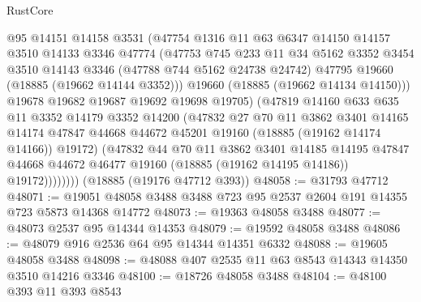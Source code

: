 \begin{lexlean}{RustCore}
\begin{coremodule}
                  @95
                  @14151
                  @14158
                  @3531
                  (@47754
                    @1316
                    @11
                    @63
                    @6347
                    @14150
                    @14157
                    @3510
                    @14133
                    @3346
                    @47774
                    (@47753
                      @745
                      @233
                      @11
                      @34
                      @5162
                      @3352
                      @3454
                      @3510
                      @14143
                      @3346
                      (@47788 @744 @5162 @24738 @24742)
                      @47795
                      @19660
                      (@18885 (@19662 @14144 @3352)))
                    @19660
                    (@18885 (@19662 @14134 @14150)))
                  @19678
                  @19682
                  @19687
                  @19692
                  @19698
                  @19705)
                (@47819
                  @14160
                  @633
                  @635
                  @11
                  @3352
                  @14179
                  @3352
                  @14200
                  (@47832
                    @27
                    @70
                    @11
                    @3862
                    @3401
                    @14165
                    @14174
                    @47847
                    @44668
                    @44672
                    @45201
                    @19160
                    (@18885 (@19162 @14174 @14166))
                    @19172)
                  (@47832
                    @44
                    @70
                    @11
                    @3862
                    @3401
                    @14185
                    @14195
                    @47847
                    @44668
                    @44672
                    @46477
                    @19160
                    (@18885 (@19162 @14195 @14186))
                    @19172))))))))
    (@18885 (@19176 @47712 @393))
@48058 := @31793 @47712
@48071 := @19051 @48058 @3488 @3488 @723 @95 @2537 @2604 @191 @14355 @723 @5873 @14368 @14772
@48073 := @19363 @48058 @3488
@48077 := @48073 @2537 @95 @14344 @14353
@48079 := @19592 @48058 @3488
@48086 := @48079 @916 @2536 @64 @95 @14344 @14351 @6332
@48088 := @19605 @48058 @3488
@48098 := @48088 @407 @2535 @11 @63 @8543 @14343 @14350 @3510 @14216 @3346
@48100 := @18726 @48058 @3488
@48104 := @48100 @393 @11 @393 @8543

\end{coremodule}
\end{lexlean}
